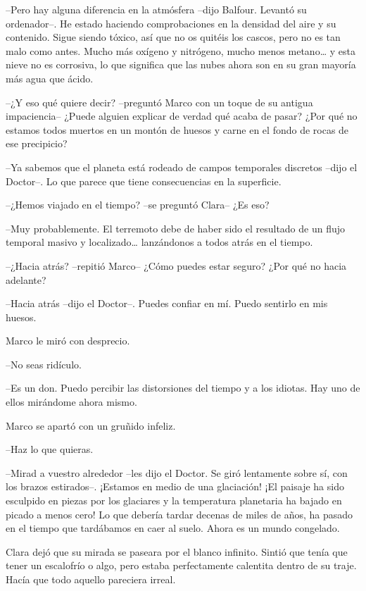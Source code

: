 {--Pero hay alguna diferencia en la atmósfera --dijo Balfour. Levantó su
 ordenador--. He estado haciendo comprobaciones en la densidad del aire y
 su contenido. Sigue siendo tóxico, así que no os quitéis los cascos,
 pero no es tan malo como antes. Mucho más oxígeno y nitrógeno, mucho
 menos metano\ldots{} y esta nieve no es corrosiva, lo que significa que
las nubes ahora son en su gran mayoría más agua que ácido.}

{--¿Y eso qué quiere decir? --preguntó Marco con un toque de su antigua
 impaciencia-- ¿Puede alguien explicar de verdad qué acaba de pasar? ¿Por
 qué no estamos todos muertos en un montón de huesos y carne en el fondo
de rocas de ese precipicio?}

{--Ya sabemos que el planeta está rodeado de campos temporales discretos
 --dijo el Doctor--. Lo que parece que tiene consecuencias en la
superficie.}

{--¿Hemos viajado en el tiempo? --se preguntó Clara-- ¿Es eso?}

{--Muy probablemente. El terremoto debe de haber sido el resultado de un
 flujo temporal masivo y localizado\ldots{} lanzándonos a todos atrás en
el tiempo.}

{--¿Hacia atrás? --repitió Marco-- ¿Cómo puedes estar seguro? ¿Por qué no
hacia adelante?}

{--Hacia atrás --dijo el Doctor--. Puedes confiar en mí. Puedo sentirlo
en mis huesos.}

{Marco le miró con desprecio.}

{--No seas ridículo.}

{--Es un don. Puedo percibir las distorsiones del tiempo y a los idiotas.
Hay uno de ellos mirándome ahora mismo.}

{Marco se apartó con un gruñido infeliz.}

{--Haz lo que quieras.}

{--Mirad a vuestro alrededor --les dijo el Doctor. Se giró lentamente
 sobre sí, con los brazos estirados--. ¡Estamos en medio de una
 glaciación! ¡El paisaje ha sido esculpido en piezas por los glaciares y
 la temperatura planetaria ha bajado en picado a menos cero! Lo que
 debería tardar decenas de miles de años, ha pasado en el tiempo que
tardábamos en caer al suelo. Ahora es un mundo congelado.}

{Clara dejó que su mirada se paseara por el blanco infinito. Sintió que
 tenía que tener un escalofrío o algo, pero estaba perfectamente
calentita dentro de su traje. Hacía que todo aquello pareciera irreal.}


